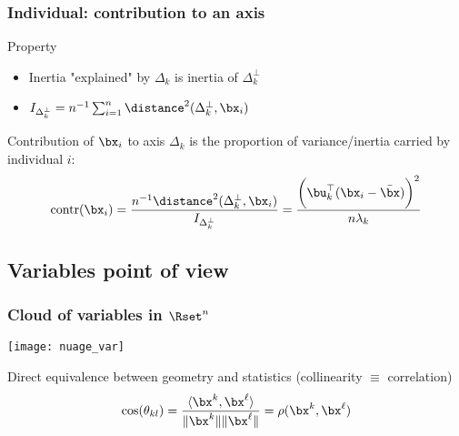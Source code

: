 \begin{frame}[fragile]
  \frametitle{Individual: contribution to an axis}


  \begin{block}{Property}
    \begin{itemize}
      \item Inertia "explained" by $\Delta_k$ is inertia of $\Delta_k^\bot$
      \item $I_{\Delta_k^\bot} = n^{-1}\sum_{i=1}^n \distance^2(\Delta_k^\bot, \bx_i) $
    \end{itemize}
  \end{block}
 
     Contribution of $\bx_i$ to axis $\Delta_k$ is the proportion of variance/inertia carried by individual $i$:
     \begin{equation*}
       \mathrm{contr} (\bx_i) = \frac{n^{-1}\distance^2(\Delta_k^\bot, \bx_i)}{I_{\Delta_k^\bot}} = \frac{\bigg(\bu_k^\top (\bx_i - \bar{\bx})\bigg)^2}{n\lambda_k} 
     \end{equation*}


\begin{knitrout}
\color{fgcolor}
\end{knitrout}
  
\end{frame}

\subsection{Variables point of view}

\begin{frame}
  \frametitle{Cloud of variables in $\Rset^n$}
  
  \begin{center}
    \texttt{[image: nuage\_var]}
  \end{center}

  Direct equivalence between geometry and statistics (collinearity $\equiv$ correlation) 
  \begin{equation*}
    \cos(\theta_{kl}) = \frac{\langle \bx^k ,\bx^\ell \rangle}{\|\bx^k\| \|\bx^\ell\|} = \rho(\bx^k,\bx^\ell)
  \end{equation*}

\end{frame}

